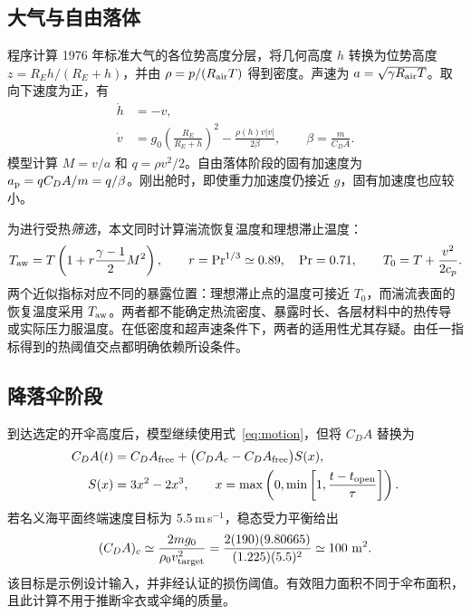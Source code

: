 \documentclass[11pt,a4paper]{article}
\begin{document}
\subsection{大气与自由落体}
程序计算 1976 年标准大气的各位势高度分层，将几何高度 $h$ 转换为位势高度 $z=R_Eh/(R_E+h)$，并由 $\rho=p/(R_{\rm air}T)$ 得到密度。声速为 $a=\sqrt{\gamma R_{\rm air}T}$。取向下速度为正，有
\begin{align}
\dot h&=-v,\\
\dot v&=g_0\left(\frac{R_E}{R_E+h}\right)^2-\frac{\rho(h)v|v|}{2\beta},
\qquad
\beta=\frac{m}{C_DA}.
\label{eq:motion}
\end{align}
模型计算 $M=v/a$ 和 $q=\rho v^2/2$。自由落体阶段的固有加速度为 $a_{\rm p}=qC_DA/m=q/\beta$。刚出舱时，即使重力加速度仍接近 $g$，固有加速度也应较小。

为进行受热\emph{筛选}，本文同时计算湍流恢复温度和理想滞止温度：
\begin{equation}
T_{\rm aw}=T\left(1+r\frac{\gamma-1}{2}M^2\right),\qquad
r=\mathrm{Pr}^{1/3}\simeq 0.89,\quad \mathrm{Pr}=0.71,
\qquad T_0=T+\frac{v^2}{2c_p}.
\label{eq:heat}
\end{equation}
两个近似指标对应不同的暴露位置：理想滞止点的温度可接近 $T_0$，而湍流表面的恢复温度采用 $T_{\rm aw}$。两者都不能确定热流密度、暴露时长、各层材料中的热传导或实际压力服温度。在低密度和超声速条件下，两者的适用性尤其存疑。由任一指标得到的热阈值交点都明确依赖所设条件。

\subsection{降落伞阶段}
到达选定的开伞高度后，模型继续使用式~\eqref{eq:motion}，但将 $C_DA$ 替换为
\begin{equation}
\begin{aligned}
C_DA(t)&=C_DA_{\rm free}
 +\bigl(C_DA_c-C_DA_{\rm free}\bigr)S(x),\\
S(x)&=3x^2-2x^3,\qquad
x=\max\left(0,\min\left[1,\frac{t-t_{\rm open}}{\tau}\right]\right).
\end{aligned}
\label{eq:canopy}
\end{equation}
若名义海平面终端速度目标为 5.5\,m\,s$^{-1}$，稳态受力平衡给出
\begin{equation}
(C_DA)_c \simeq \frac{2mg_0}{\rho_0v_{\rm target}^2}
=\frac{2(190)(9.80665)}{(1.225)(5.5)^2}
\simeq 100\ {\rm m^2}.
\label{eq:canopysize}
\end{equation}
该目标是示例设计输入，并非经认证的损伤阈值。有效阻力面积不同于伞布面积，且此计算不用于推断伞衣或伞绳的质量。
\end{document}
